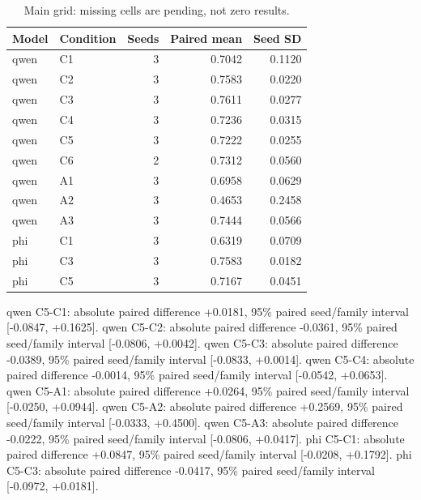 \begin{table}[ht]\centering
\caption{Main grid: missing cells are pending, not zero results.}
\begin{tabular}{llrrr}\toprule Model & Condition & Seeds & Paired mean & Seed SD\\\midrule
qwen & C1 & 3 & 0.7042 & 0.1120\\
qwen & C2 & 3 & 0.7583 & 0.0220\\
qwen & C3 & 3 & 0.7611 & 0.0277\\
qwen & C4 & 3 & 0.7236 & 0.0315\\
qwen & C5 & 3 & 0.7222 & 0.0255\\
qwen & C6 & 2 & 0.7312 & 0.0560\\
qwen & A1 & 3 & 0.6958 & 0.0629\\
qwen & A2 & 3 & 0.4653 & 0.2458\\
qwen & A3 & 3 & 0.7444 & 0.0566\\
phi & C1 & 3 & 0.6319 & 0.0709\\
phi & C3 & 3 & 0.7583 & 0.0182\\
phi & C5 & 3 & 0.7167 & 0.0451\\
\bottomrule\end{tabular}\end{table}
qwen C5-C1: absolute paired difference +0.0181, 95\% paired seed/family interval [-0.0847, +0.1625]. 
qwen C5-C2: absolute paired difference -0.0361, 95\% paired seed/family interval [-0.0806, +0.0042]. 
qwen C5-C3: absolute paired difference -0.0389, 95\% paired seed/family interval [-0.0833, +0.0014]. 
qwen C5-C4: absolute paired difference -0.0014, 95\% paired seed/family interval [-0.0542, +0.0653]. 
qwen C5-A1: absolute paired difference +0.0264, 95\% paired seed/family interval [-0.0250, +0.0944]. 
qwen C5-A2: absolute paired difference +0.2569, 95\% paired seed/family interval [-0.0333, +0.4500]. 
qwen C5-A3: absolute paired difference -0.0222, 95\% paired seed/family interval [-0.0806, +0.0417]. 
phi C5-C1: absolute paired difference +0.0847, 95\% paired seed/family interval [-0.0208, +0.1792]. 
phi C5-C3: absolute paired difference -0.0417, 95\% paired seed/family interval [-0.0972, +0.0181]. 
